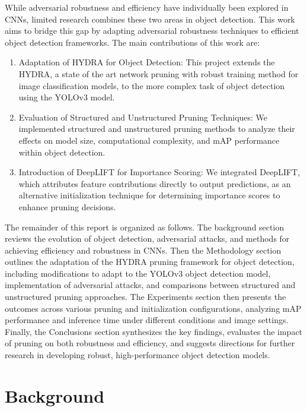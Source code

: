 \documentclass[journal,onecolumn,12pt]{IEEEtran}
\begin{document}
While adversarial robustness and efficiency have individually been explored in CNNs, limited research combines these two areas in object detection. This work aims to bridge this gap by adapting adversarial robustness techniques to efficient object detection frameworks. The main contributions of this work are:

\begin{enumerate}
    \item Adaptation of HYDRA for Object Detection: This project extends the HYDRA, a state of the art network pruning with robust training method for image classification models, to the more complex task of object detection using the YOLOv3 model.
    \item Evaluation of Structured and Unstructured Pruning Techniques: We implemented structured and unstructured pruning methods to analyze their effects on model size, computational complexity, and mAP performance within object detection.
    \item Introduction of DeepLIFT for Importance Scoring: We integrated DeepLIFT, which attributes feature contributions directly to output predictions, as an alternative initialization technique for determining importance scores to enhance pruning decisions.
\end{enumerate}

The remainder of this report is organized as follows. The background section reviews the evolution of object detection, adversarial attacks, and methods for achieving efficiency and robustness in CNNs. Then the Methodology section outlines the adaptation of the HYDRA pruning framework for object detection, including modifications to adapt to the YOLOv3 object detection model, implementation of adversarial attacks, and comparisons between structured and unstructured pruning approaches. The Experiments section then presents the outcomes across various pruning and initialization configurations, analyzing mAP performance and inference time under different conditions and image settings. Finally, the Conclusions section synthesizes the key findings, evaluates the impact of pruning on both robustness and efficiency, and suggests directions for further research in developing robust, high-performance object detection models.

\section{Background}
\end{document}
